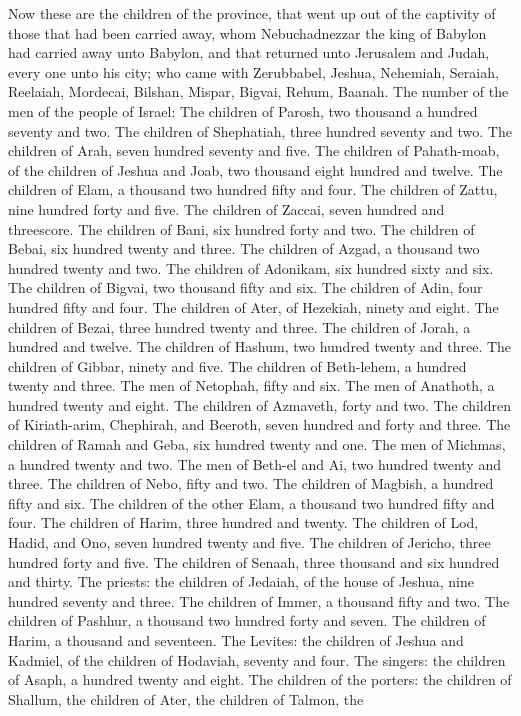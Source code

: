 Now these are the children of the province, that went up out of the captivity of those that had been carried away, whom Nebuchadnezzar the king of Babylon had carried away unto Babylon, and that returned unto Jerusalem and Judah, every one unto his city; who came with Zerubbabel, Jeshua, Nehemiah, Seraiah, Reelaiah, Mordecai, Bilshan, Mispar, Bigvai, Rehum, Baanah. The number of the men of the people of Israel: The children of Parosh, two thousand a hundred seventy and two. The children of Shephatiah, three hundred seventy and two. The children of Arah, seven hundred seventy and five. The children of Pahath-moab, of the children of Jeshua and Joab, two thousand eight hundred and twelve. The children of Elam, a thousand two hundred fifty and four. The children of Zattu, nine hundred forty and five. The children of Zaccai, seven hundred and threescore. The children of Bani, six hundred forty and two. The children of Bebai, six hundred twenty and three. The children of Azgad, a thousand two hundred twenty and two. The children of Adonikam, six hundred sixty and six. The children of Bigvai, two thousand fifty and six. The children of Adin, four hundred fifty and four. The children of Ater, of Hezekiah, ninety and eight. The children of Bezai, three hundred twenty and three. The children of Jorah, a hundred and twelve. The children of Hashum, two hundred twenty and three. The children of Gibbar, ninety and five. The children of Beth-lehem, a hundred twenty and three. The men of Netophah, fifty and six. The men of Anathoth, a hundred twenty and eight. The children of Azmaveth, forty and two. The children of Kiriath-arim, Chephirah, and Beeroth, seven hundred and forty and three. The children of Ramah and Geba, six hundred twenty and one. The men of Michmas, a hundred twenty and two. The men of Beth-el and Ai, two hundred twenty and three. The children of Nebo, fifty and two. The children of Magbish, a hundred fifty and six. The children of the other Elam, a thousand two hundred fifty and four. The children of Harim, three hundred and twenty. The children of Lod, Hadid, and Ono, seven hundred twenty and five. The children of Jericho, three hundred forty and five. The children of Senaah, three thousand and six hundred and thirty.  The priests: the children of Jedaiah, of the house of Jeshua, nine hundred seventy and three. The children of Immer, a thousand fifty and two. The children of Pashhur, a thousand two hundred forty and seven. The children of Harim, a thousand and seventeen.  The Levites: the children of Jeshua and Kadmiel, of the children of Hodaviah, seventy and four. The singers: the children of Asaph, a hundred twenty and eight. The children of the porters: the children of Shallum, the children of Ater, the children of Talmon, the 